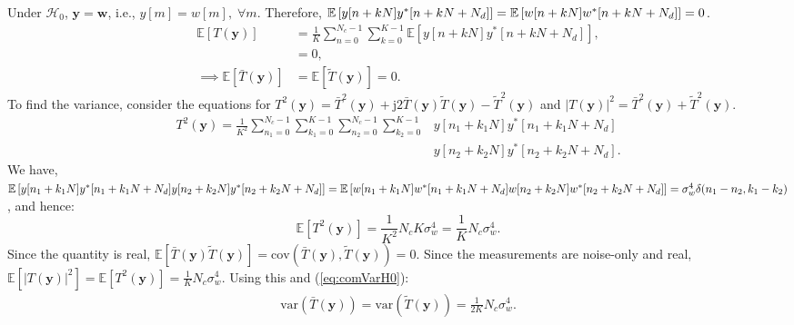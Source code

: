 \documentclass[11pt]{article}
\newcommand{\by}{\mathbf{y}}
\newcommand{\bw}{\mathbf{w}}
\newcommand{\Ex}{\mathbb{E}}
\newcommand{\cH}{\mathcal{H}}
\newcommand{\jj}{\mathrm{j}}
\begin{document}
Under $\cH_{0}$, $\by = \bw$, i.e., $y[m] = w[m], \; \forall m$. Therefore, $\Ex\left[ y[n+kN] y^{*}[n+kN+N_{d}] \right] \break = \Ex\left[ w[n+kN] w^{*}[n+kN+N_{d}] \right] = 0$.
\begin{equation}
\begin{split}
	\Ex[T(\by)] &= \frac{1}{K} \sum_{n=0}^{N_{c}-1}\sum_{k=0}^{K-1} \Ex \left[y[n+kN] y^{*}[n+kN+N_{d}]\right], \\
	&= 0, \\
	\implies \Ex[\bar{T}(\by)] &= \Ex[\tilde{T}(\by)] = 0.
\end{split}
\label{eq:meanH0}
\end{equation}
To find the variance, consider the equations for $T^{2}(\by) = \bar{T}^{2}(\by) + \jj 2\bar{T}(\by)\tilde{T}(\by) - \tilde{T}^{2}(\by)$ and $\vert T(\by) \vert^{2} = \bar{T}^{2}(\by) + \tilde{T}^{2}(\by)$.
\begin{equation}
\begin{split}
	T^{2}(\by) = \frac{1}{K^{2}} \sum_{n_{1}=0}^{N_{c}-1} \sum_{k_{1}=0}^{K-1} \sum_{n_{2}=0}^{N_{c}-1} \sum_{k_{2}=0}^{K-1} & y[n_{1}+k_{1}N] y^{*}[n_{1}+k_{1}N+N_{d}] \\ & y[n_{2}+k_{2}N] y^{*}[n_{2}+k_{2}N+N_{d}].
\end{split}
\label{eq:statSquared}
\end{equation}
We have, $\Ex \left[ y[n_{1}+k_{1}N] y^{*}[n_{1}+k_{1}N+N_{d}] y[n_{2}+k_{2}N] y^{*}[n_{2}+k_{2}N+N_{d}] \right] \break = \Ex\left[ w[n_{1}+k_{1}N] w^{*}[n_{1}+k_{1}N+N_{d}] w[n_{2}+k_{2}N] w^{*}[n_{2}+k_{2}N+N_{d}] \right] = \sigma_{w}^{4}\delta(n_{1}-n_{2},k_{1}-k_{2})$, and hence:
\begin{equation}
	\Ex\left[ T^{2}(\by) \right] = \frac{1}{K^{2}} N_{c}K\sigma_{w}^{4} = \frac{1}{K} N_{c}\sigma_{w}^{4}.
\label{eq:comVarH0}
\end{equation}
Since the quantity is real, $\Ex\left[\bar{T}(\by)\tilde{T}(\by)\right] = \mathrm{cov}\left(\bar{T}(\by),\tilde{T}(\by)\right) = 0$. Since the measurements are noise-only and real, $\Ex\left[ \vert T(\by) \vert^{2} \right] = \Ex\left[ T^{2}(\by) \right] = \frac{1}{K} N_{c}\sigma_{w}^{4}$. Using this and (\ref{eq:comVarH0}):
\begin{equation}
\begin{split}
	\mathrm{var}\left( \bar{T}(\by) \right) = \mathrm{var}\left( \tilde{T}(\by) \right) = \frac{1}{2K} N_{c}\sigma_{w}^{4}.
\end{split}
\label{eq:VarH0}
\end{equation}
\end{document}
